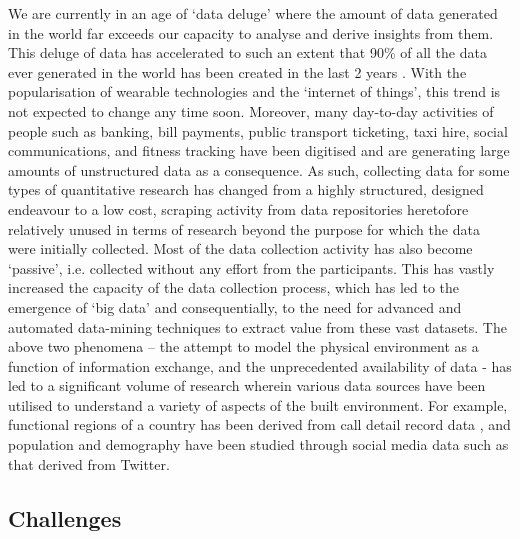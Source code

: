 We are currently in an age of `data deluge' where the amount of data generated in the world far exceeds our capacity to analyse and derive insights from them.
This deluge of data has accelerated to such an extent that 90\% of all the data ever  generated in the world has been created in the last 2 years \cite{ibm2016}.
With the popularisation of wearable technologies  and the `internet of things', this trend is not expected to change any time soon.
Moreover, many day-to-day  activities of people such  as banking, bill payments, public transport ticketing, taxi hire, social communications, and fitness tracking have been digitised and are generating large amounts of unstructured data as a consequence.
As such, collecting data for some types of quantitative research has changed from a highly structured, designed endeavour to a low cost, scraping activity from data repositories heretofore relatively unused in terms of research beyond the purpose for which the data were initially collected.
Most of the data collection activity has also become `passive', i.e. collected without any effort from the participants.
This has vastly increased the capacity of the data collection process, which has led to the emergence of `big data' and consequentially, to the need for advanced and automated data-mining techniques to extract value from these vast datasets.
The above two phenomena – the attempt to model the physical environment as a function of information exchange, and the unprecedented availability of data - has led to a significant volume of research wherein various data sources have been utilised to understand a variety of aspects of the built environment.
For example, functional regions of a country has been derived from call detail record data \cite{ratti2010}, and population and demography have been studied through social media data such as that derived from Twitter.

\subsection{Challenges}

